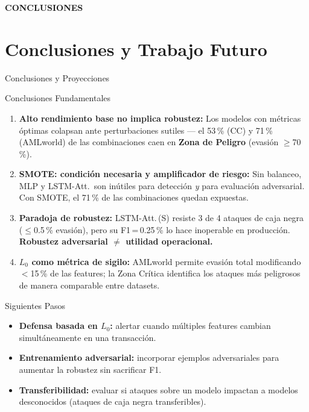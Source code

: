 \documentclass[aspectratio=169, 8pt]{beamer}
\begin{document}
\begin{frame}
\vfill
\centering
{\fontsize{28}{34}\selectfont\bfseries CONCLUSIONES}
\vfill
\end{frame}
\section{Conclusiones y Trabajo Futuro}

\begin{frame}{Conclusiones y Proyecciones}
    \begin{block}{Conclusiones Fundamentales}
        \begin{enumerate}
            \item \textbf{Alto rendimiento base no implica robustez:} Los modelos con métricas óptimas colapsan ante perturbaciones sutiles — el 53\,\% (CC) y 71\,\% (AMLworld) de las combinaciones caen en \textbf{Zona de Peligro} (evasión $\geq$70\,\%).
            \item \textbf{SMOTE: condición necesaria y amplificador de riesgo:} Sin balanceo, MLP y LSTM-Att.\ son inútiles para detección \emph{y} para evaluación adversarial. Con SMOTE, el 71\,\% de las combinaciones quedan expuestas.
            \item \textbf{Paradoja de robustez:} LSTM-Att.\,(S) resiste 3 de 4 ataques de caja negra ($\leq$0.5\,\% evasión), pero su F1\,=\,0.25\,\% lo hace inoperable en producción. \textbf{Robustez adversarial $\neq$ utilidad operacional.}
            \item \textbf{$L_0$ como métrica de sigilo:} AMLworld permite evasión total modificando $<$15\,\% de las features; la Zona Crítica identifica los ataques más peligrosos de manera comparable entre datasets.
        \end{enumerate}
    \end{block}

    \vspace{0.15cm}
    \begin{exampleblock}{Siguientes Pasos}
        \begin{itemize}
            \item \textbf{Defensa basada en $L_0$:} alertar cuando múltiples features cambian simultáneamente en una transacción.
            \item \textbf{Entrenamiento adversarial:} incorporar ejemplos adversariales para aumentar la robustez sin sacrificar F1.
            \item \textbf{Transferibilidad:} evaluar si ataques sobre un modelo impactan a modelos desconocidos (ataques de caja negra transferibles).
        \end{itemize}
    \end{exampleblock}
\end{frame}
\end{document}
